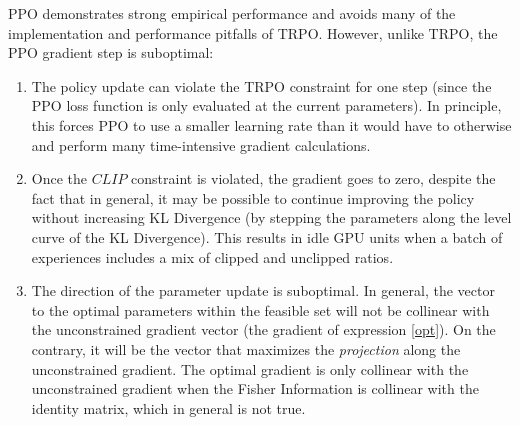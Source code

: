 \documentclass{article}
\begin{document}
PPO demonstrates strong empirical performance and avoids many of the
implementation and performance pitfalls of TRPO. However, unlike TRPO, the PPO
gradient step is suboptimal:
\begin{enumerate}
  \item The policy update can violate the TRPO
constraint for one step (since the PPO loss function is only evaluated at the
current parameters). In principle, this forces PPO to use a smaller
learning rate than it would have to otherwise and perform many time-intensive
gradient calculations.
\item Once the $CLIP$ constraint is violated, the gradient goes to zero, despite
  the fact that in general, it may be possible to continue improving the policy
  without increasing KL Divergence (by stepping the parameters along the level
  curve of the KL Divergence). This results in idle GPU units when
  a batch of experiences includes a mix of clipped and unclipped ratios.
\item The direction of the parameter update is suboptimal. In general, the
  vector to
  the optimal parameters within the feasible set will not be collinear with the
  unconstrained gradient vector (the gradient of expression \ref{opt}). On the contrary, it will be the vector that
  maximizes the \textit{projection} along the unconstrained gradient. The
  optimal gradient is only collinear with the unconstrained gradient when the
  Fisher Information is collinear with the identity matrix, which in general is
  not true.
\end{enumerate}
\end{document}
